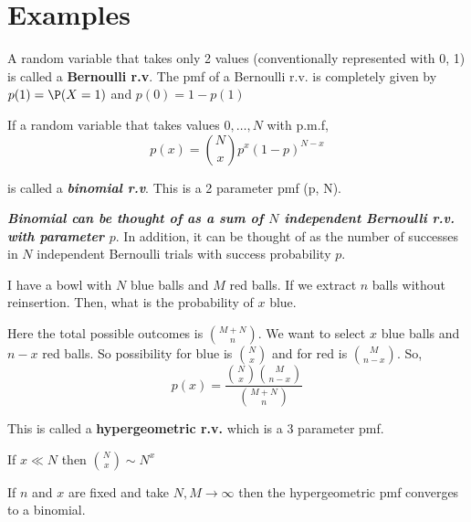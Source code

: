 \section{Examples}

\begin{eg}
	A random variable that takes only 2 values (conventionally represented with 0, 1) is called a \textbf{Bernoulli r.v}. The pmf of a Bernoulli  r.v. is completely given by $p(1) = \P(X = 1)$ and $p(0) = 1 - p(1)$
\end{eg}
\begin{eg}
    If a random variable that takes values $0, \dots, N$ with  p.m.f, 
    $$ p(x) = {N \choose x} p^{x}(1 - p)^{N - x} $$ 

    is called a \emph{\textbf{binomial r.v}}. This is a 2 parameter pmf (p, N).
    \vspace{1em}


\end{eg}
\begin{remark}
    \textbf{\emph{Binomial can be thought of as a sum of $N$ independent Bernoulli r.v. with parameter $p$}}. In addition, it can be thought of as the number of successes in $N$ independent Bernoulli trials with success probability $p$.
\end{remark}

\begin{eg}
    I have a bowl with $N$ blue balls and $M$ red balls. If we extract $n$ balls without reinsertion. Then, what is the probability of $x$ blue.
    \vspace{1em}
    

    Here the total possible outcomes is ${M + N \choose n}$. We want to select  $x$ blue balls and $n - x$ red balls. So possibility for blue  is   ${N \choose x}$ and for red is  ${M \choose n - x}$. So, 
    $$ p(x) = \frac{{N \choose x}{M \choose n - x}}{{M + N \choose n}} $$ 


    This is called a \textbf{hypergeometric r.v.}  which is a 3 parameter pmf.
\end{eg}
\begin{note}
    If $x \ll N$ then  ${N \choose x} \sim N^{x}$
\end{note}
\begin{remark}
    If $n$ and  $x$ are fixed and take $N, M \to \infty$ then the hypergeometric pmf converges to a binomial.
\end{remark}



